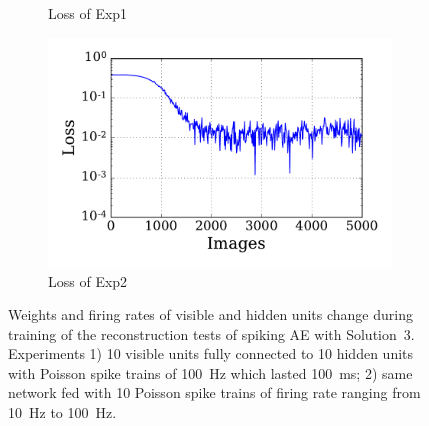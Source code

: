\begin{figure}
\begin{subfigure}[t]{0.48\textwidth}
		\caption{Loss of Exp1}
	\end{subfigure}
	\begin{subfigure}[t]{0.48\textwidth}
		\includegraphics[width=\textwidth]{pics_sdlm/05_exp_SAE_teach_long/exp2_mse_nons.pdf}
		\caption{Loss of Exp2}
	\end{subfigure}
	\caption[SAE-S3 training of the reconstruction tests.]{Weights and firing rates of visible and hidden units change during training of the reconstruction tests of spiking AE with Solution~3. 
		Experiments 1) 10 visible units fully connected to 10 hidden units with Poisson spike trains of 100~Hz which lasted 100~ms; 2) same network fed with 10 Poisson spike trains of firing rate ranging from 10~Hz to 100~Hz.}
	\label{fig:sol3_ae}
\end{figure}

